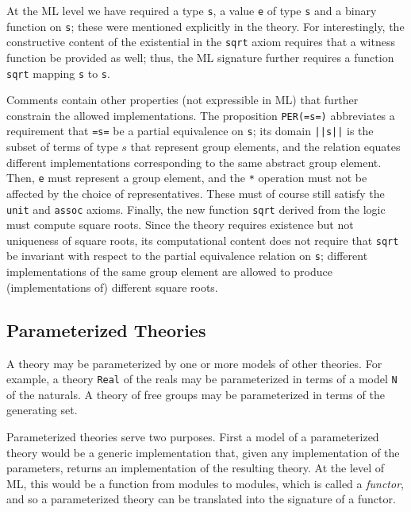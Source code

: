 At the ML level we have required a type \Verb|s|, a value \Verb|e| of
type \Verb|s| and a binary function on \Verb|s|;  these were mentioned explicitly in the theory.
For interestingly, the constructive content of the existential in the
\Verb|sqrt| axiom requires that a witness function be provided as
well; thus, the ML signature further requires a function \Verb|sqrt|
mapping \Verb|s| to \Verb|s|.

Comments contain other properties (not expressible in ML) that further
constrain the allowed implementations.  The proposition \Verb|PER(=s=)| 
abbreviates a requirement that \Verb|=s=| be a partial equivalence 
on \Verb|s|; its domain \Verb+||s||+ is the
subset of terms of type $s$ that represent group elements, and the
relation equates different implementations corresponding to the same
abstract group element.  Then, \Verb|e| must represent a
group element, and the \Verb|*| operation must not be affected by the
choice of representatives.  These must of course still satisfy the
\Verb|unit| and \Verb|assoc| axioms.  Finally, the new function
\Verb|sqrt| derived from the logic must compute square roots.  Since
the theory requires existence but not uniqueness of square roots, its
computational content does not require that \Verb|sqrt| be invariant
with respect to the partial equivalence relation on \Verb|s|;
different implementations of the same group element are allowed to produce
(implementations of) different square roots.  


\subsection{Parameterized Theories}
\label{sec:param-theor-funct}

A theory may be parameterized by one or more models of other theories.
For example, a theory \Verb|Real| of the reals may be parameterized in
terms of a model \Verb|N| of the naturals.  A theory of free groups may be
parameterized in terms of the generating set.

Parameterized theories serve two purposes.  First a model of a
parameterized theory would be a generic implementation that, given any
implementation of the parameters, returns an implementation of the
resulting theory.  At the level of ML, this would be a function from
modules to modules, which is called a \emph{functor}, and so a
parameterized theory can be translated into the signature of a
functor.

